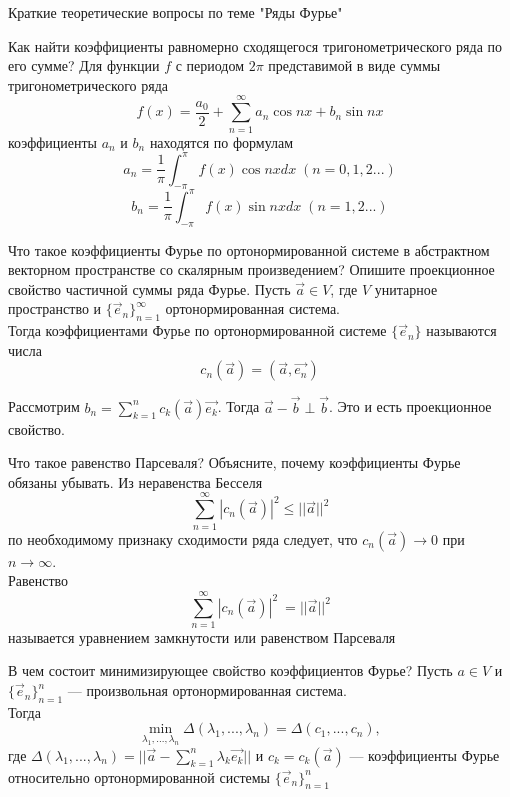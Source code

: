 \documentclass{article}
\begin{document}
\begin{section}{Краткие теоретические вопросы по теме "Ряды Фурье"}

\begin{subsection}{Как найти коэффициенты равномерно сходящегося тригонометрического ряда по его сумме?}
Для функции $f$ с периодом $2\pi$ представимой в виде суммы тригонометрического ряда 
\[f(x) = \frac{a_0}{2}+\sum_{n=1}^{\infty}a_n \cos nx +b_n \sin nx\]
коэффициенты $a_n$ и $b_n$ находятся по формулам
\[a_n = \frac{1}{\pi}\int_{-\pi}^\pi f(x)\cos n x dx\; (n = 0, 1, 2 ...)\]
\[b_n = \frac{1}{\pi}\int_{-\pi}^\pi f(x)\sin n x dx\; (n = 1, 2 ...)\]
\end{subsection}


\begin{subsection}{Что такое коэффициенты Фурье по ортонормированной системе в абстрактном векторном пространстве со скалярным произведением? Опишите проекционное свойство частичной суммы ряда Фурье.}
Пусть $\vec{a} \in V$, где $V$ унитарное пространство и $\{\vec{e}_n\}_{n=1}^{\infty}$ ортонормированная система.\\
Тогда коэффициентами Фурье по ортонормированной системе $\{\vec{e}_n\}$ называются числа 
\[ c_n(\vec{a}) = (\vec{a}, \vec{e_n})\]

Рассмотрим $b_n = \sum_{k=1}^n c_k(\vec{a})\vec{e_k}$. Тогда $\vec{a}-\vec{b} \perp \vec{b}$. Это и есть проекционное свойство.
\end{subsection}


\begin{subsection}{Что такое равенство Парсеваля? Объясните, почему коэффициенты Фурье обязаны убывать.}
Из неравенства Бесселя 
\[\sum_{n=1}^{\infty}|c_n(\vec{a})|^2\leq ||\vec{a}||^2\]
по необходимому признаку сходимости ряда следует, что $c_n(\vec{a}) \rightarrow 0$ при $n \rightarrow \infty$.\\
Равенство 
\[\sum_{n=1}^{\infty}|c_n(\vec{a})|^2\ = ||\vec{a}||^2\]
называется уравнением замкнутости или равенством Парсеваля
\end{subsection}


\begin{subsection}{В чем состоит минимизирующее свойство коэффициентов Фурье?}
Пусть $a \in V$ и $\{\vec{e}_n\}_{n=1}^{n}$ --- произвольная ортонормированная система.\\
Тогда \[\min_{\lambda_1,...,\lambda_n} \Delta (\lambda_1,...,\lambda_n) = \Delta(c_1,...,c_n),\]
где $\Delta (\lambda_1,...,\lambda_n) = ||\vec{a}-\sum_{k=1}^n\lambda_k\vec{e_k}||$ и 
$c_k = c_k(\vec{a})$ --- коэффициенты Фурье относительно ортонормированной системы $\{\vec{e}_n\}_{n=1}^{n}$
\end{subsection}



\end{section}
\end{document}
